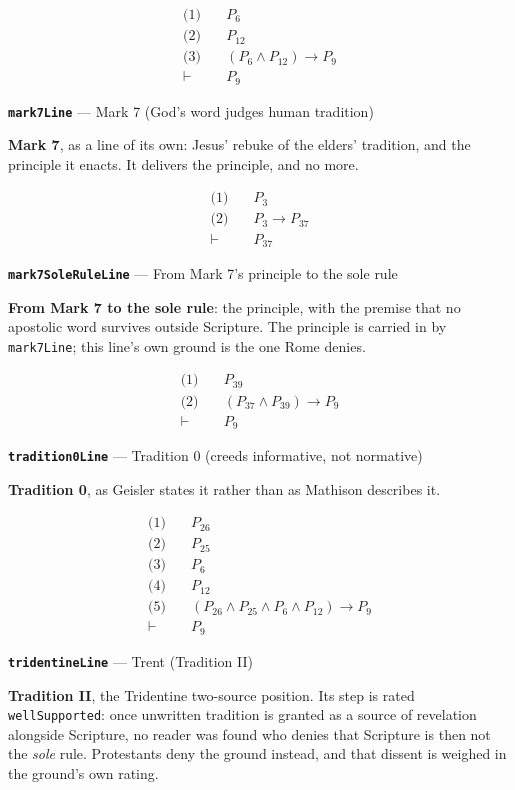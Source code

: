 \documentclass[11pt]{article}
\begin{document}
\begin{align*}
  \text{(1)} \quad & P_{6} \\
  \text{(2)} \quad & P_{12} \\
  \text{(3)} \quad & (P_{6} \land P_{12}) \rightarrow P_{9} \\
  \vdash \quad & P_{9}
\end{align*}
\par\medskip\noindent\textbf{\texttt{mark7\allowbreak{}Line}} --- Mark 7 (God's word judges human tradition)\par\nobreak\noindent
\textbf{Mark 7}, as a line of its own: Jesus' rebuke of the elders' tradition, and the principle it enacts. It delivers the principle, and no more.

\begin{align*}
  \text{(1)} \quad & P_{3} \\
  \text{(2)} \quad & P_{3} \rightarrow P_{37} \\
  \vdash \quad & P_{37}
\end{align*}
\par\medskip\noindent\textbf{\texttt{mark7\allowbreak{}Sole\allowbreak{}Rule\allowbreak{}Line}} --- From Mark 7's principle to the sole rule\par\nobreak\noindent
\textbf{From Mark 7 to the sole rule}: the principle, with the premise that no apostolic word survives outside Scripture. The principle is carried in by \texttt{mark7\allowbreak{}Line}; this line's own ground is the one Rome denies.

\begin{align*}
  \text{(1)} \quad & P_{39} \\
  \text{(2)} \quad & (P_{37} \land P_{39}) \rightarrow P_{9} \\
  \vdash \quad & P_{9}
\end{align*}
\par\medskip\noindent\textbf{\texttt{tradition0\allowbreak{}Line}} --- Tradition 0 (creeds informative, not normative)\par\nobreak\noindent
\textbf{Tradition 0}, as Geisler states it rather than as Mathison describes it.

\begin{align*}
  \text{(1)} \quad & P_{26} \\
  \text{(2)} \quad & P_{25} \\
  \text{(3)} \quad & P_{6} \\
  \text{(4)} \quad & P_{12} \\
  \text{(5)} \quad & (P_{26} \land P_{25} \land P_{6} \land P_{12}) \rightarrow P_{9} \\
  \vdash \quad & P_{9}
\end{align*}
\par\medskip\noindent\textbf{\texttt{tridentine\allowbreak{}Line}} --- Trent (Tradition II)\par\nobreak\noindent
\textbf{Tradition II}, the Tridentine two-source position. Its step is rated \texttt{well\allowbreak{}Supported}: once unwritten tradition is granted as a source of revelation alongside Scripture, no reader was found who denies that Scripture is then not the \emph{sole} rule. Protestants deny the ground instead, and that dissent is weighed in the ground's own rating.
\end{document}
